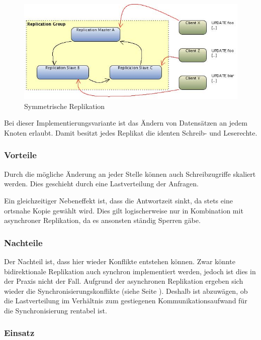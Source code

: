 \begin{figure}[!h]
	\begin{center}
		\includegraphics[width=1\linewidth]{images/bidirektional.jpg}
		\caption{Symmetrische Replikation \cite{leipzig}}
		\label{bidirektional}
	\end{center}
\end{figure}

Bei dieser Implementierungsvariante ist das Ändern von Datensätzen an jedem Knoten erlaubt. \cite{leipzig} Damit besitzt jedes Replikat die identen Schreib- und Leserechte.

\subsubsection{Vorteile}

Durch die mögliche Änderung an jeder Stelle können auch Schreibzugriffe skaliert werden. Dies geschieht durch eine Lastverteilung der Anfragen.

Ein gleichzeitiger Nebeneffekt ist, dass die Antwortzeit sinkt, da stets eine ortsnahe Kopie gewählt wird. Dies gilt logischerweise nur in Kombination mit asynchroner Replikation, da es ansonsten ständig Sperren gäbe.

\subsubsection{Nachteile}

Der Nachteil ist, dass hier wieder Konflikte entstehen können. Zwar könnte bidirektionale Replikation auch synchron implementiert werden, jedoch ist dies in der Praxis nicht der Fall. Aufgrund der asynchronen Replikation ergeben sich wieder die Synchronisierungskonflikte (siehe Seite \pageref{syncprob}). Deshalb ist abzuwägen, ob die Lastverteilung im Verhältnis zum gestiegenen Kommunikationsaufwand für die Synchronisierung rentabel ist. \cite{leipzig}

\subsubsection{Einsatz}

